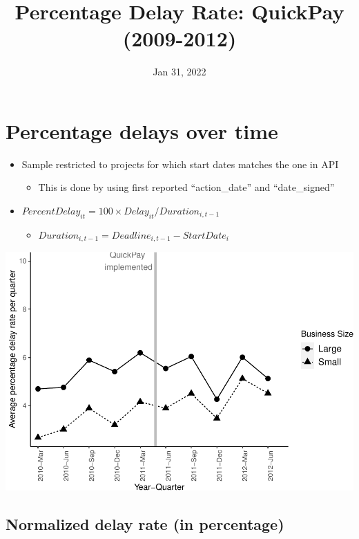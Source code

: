 \documentclass[
]{article}
\title{Percentage Delay Rate: QuickPay (2009-2012)}
\author{}
\date{\vspace{-2.5em}Jan 31, 2022}
\providecommand{\tightlist}{%
  \setlength{\itemsep}{0pt}\setlength{\parskip}{0pt}}
\begin{document}
\maketitle

\hypertarget{percentage-delays-over-time}{%
\section{Percentage delays over
time}\label{percentage-delays-over-time}}

\begin{itemize}
\tightlist
\item
  Sample restricted to projects for which start dates matches the one in
  API

  \begin{itemize}
  \tightlist
  \item
    This is done by using first reported ``action\_date'' and
    ``date\_signed''
  \end{itemize}
\item
  \(PercentDelay_{it}=100 \times Delay_{it}/Duration_{i,t-1}\)

  \begin{itemize}
  \tightlist
  \item
    \(Duration_{i,t-1} = Deadline_{i,t-1} - StartDate_i\)
  \end{itemize}
\end{itemize}

\includegraphics{qp_first_pc_delay_files/figure-latex/plot_pc_delay-1.pdf}

\hypertarget{normalized-delay-rate-in-percentage}{%
\subsection{Normalized delay rate (in
percentage)}\label{normalized-delay-rate-in-percentage}}
\end{document}
